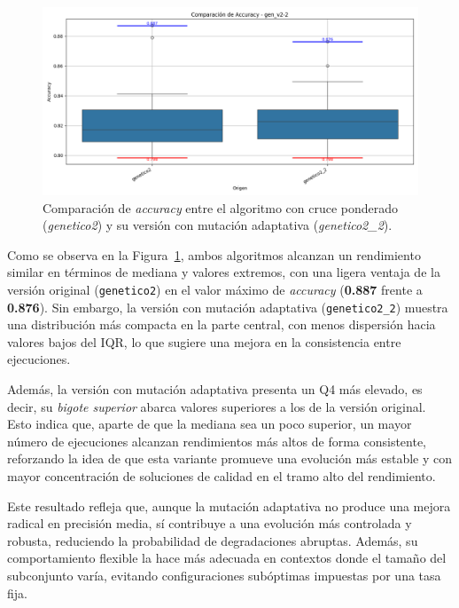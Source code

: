 \begin{figure}[H]
    \centering
    \includegraphics[width=1\textwidth]{imagenes/evaluaciones/mutacion-adaptativa}
    \caption{Comparación de \textit{accuracy} entre el algoritmo con cruce ponderado (\textit{genetico2}) y su versión con mutación adaptativa (\textit{genetico2\_2}).}
    \label{fig:mutacion-adaptativa}
\end{figure}

Como se observa en la Figura~\ref{fig:mutacion-adaptativa}, ambos algoritmos alcanzan un rendimiento similar en términos de mediana y valores extremos,
con una ligera ventaja de la versión original (\texttt{genetico2}) en el valor máximo de \textit{accuracy} (\textbf{0.887} frente a \textbf{0.876}).
Sin embargo, la versión con mutación adaptativa (\texttt{genetico2\_2}) muestra una distribución más compacta en la parte central,
con menos dispersión hacia valores bajos del IQR, lo que sugiere una mejora en la consistencia entre ejecuciones.

Además, la versión con mutación adaptativa presenta un Q4 más elevado, es decir, su \textit{bigote superior} abarca valores superiores a los de la versión original.
Esto indica que, aparte de que la mediana sea un poco superior, un mayor número de ejecuciones alcanzan rendimientos más altos de forma consistente,
reforzando la idea de que esta variante promueve una evolución más estable y con mayor concentración de soluciones de calidad en el tramo alto del rendimiento.

Este resultado refleja que, aunque la mutación adaptativa no produce una mejora radical en precisión media,
sí contribuye a una evolución más controlada y robusta, reduciendo la probabilidad de degradaciones abruptas.
Además, su comportamiento flexible la hace más adecuada en contextos donde el tamaño del subconjunto varía,
evitando configuraciones subóptimas impuestas por una tasa fija.


